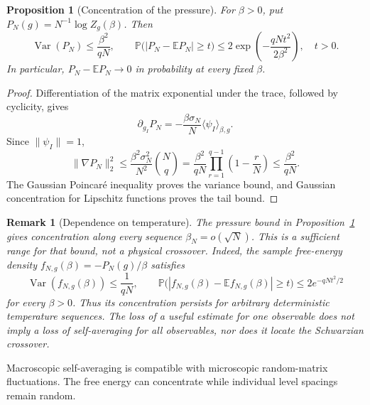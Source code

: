 \documentclass[11pt]{article}
\numberwithin{equation}{section}
\theoremstyle{exposition}
\newtheorem{remark}[definition]{Remark}
\theoremstyle{result}
\newtheorem{proposition}[definition]{Proposition}
\newcommand{\E}{\mathbb E}
\newcommand{\Pp}{\mathbb P}
\begin{document}
\begin{proposition}[Concentration of the pressure]\label{prop:concentration}
For $\beta>0$, put $P_N(g)=N^{-1}\log Z_g(\beta)$. Then
\begin{equation*}
\operatorname{Var}(P_N)\leq\frac{\beta^2}{qN},
\qquad
\Pp\bigl(|P_N-\E P_N|\geq t\bigr)
\leq 2\exp\left(-\frac{qNt^2}{2\beta^2}\right),\quad t>0.
\end{equation*}
In particular, $P_N-\E P_N\to0$ in probability at every fixed $\beta$.
\end{proposition}

\begin{proof}
Differentiation of the matrix exponential under the trace, followed by cyclicity, gives
\begin{equation*}
\partial_{g_I}P_N=-\frac{\beta\sigma_N}{N}\langle\psi_I\rangle_{\beta,g}.
\end{equation*}
Since $\|\psi_I\|=1$,
\begin{equation*}
\|\nabla P_N\|_2^2
\leq\frac{\beta^2\sigma_N^2}{N^2}\binom Nq
=\frac{\beta^2}{qN}\prod_{r=1}^{q-1}\left(1-\frac rN\right)
\leq\frac{\beta^2}{qN}.
\end{equation*}
The Gaussian Poincar\'e inequality proves the variance bound, and Gaussian concentration for Lipschitz functions proves the tail bound.
\end{proof}

\begin{remark}[Dependence on temperature]
The pressure bound in Proposition~\ref{prop:concentration} gives concentration along every sequence $\beta_N=o(\sqrt N)$. This is a sufficient range for that bound, not a physical crossover. Indeed, the sample free-energy density $f_{N,g}(\beta)=-P_N(g)/\beta$ satisfies
\begin{equation*}
\operatorname{Var}(f_{N,g}(\beta))\leq\frac1{qN},
\qquad
\Pp\bigl(|f_{N,g}(\beta)-\E f_{N,g}(\beta)|\geq t\bigr)
\leq2e^{-qNt^2/2}
\end{equation*}
for every $\beta>0$. Thus its concentration persists for arbitrary deterministic temperature sequences. The loss of a useful estimate for one observable does not imply a loss of self-averaging for all observables, nor does it locate the Schwarzian crossover.
\end{remark}

Macroscopic self-averaging is compatible with microscopic random-matrix fluctuations. The free energy can concentrate while individual level spacings remain random.
\end{document}
